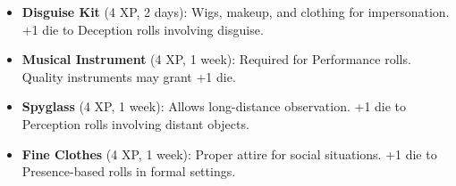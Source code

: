 \documentclass[12pt]{article}
\begin{document}
\begin{itemize}[leftmargin=*]
  \item \textbf{Disguise Kit} (4 XP, 2 days): Wigs, makeup, and clothing for impersonation. +1 die to Deception rolls involving disguise.
  \item \textbf{Musical Instrument} (4 XP, 1 week): Required for Performance rolls. Quality instruments may grant +1 die.
  \item \textbf{Spyglass} (4 XP, 1 week): Allows long-distance observation. +1 die to Perception rolls involving distant objects.
  \item \textbf{Fine Clothes} (4 XP, 1 week): Proper attire for social situations. +1 die to Presence-based rolls in formal settings.
\end{itemize}
\end{document}
